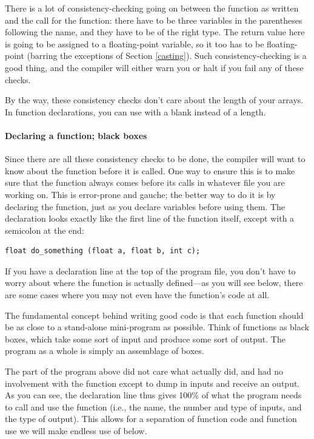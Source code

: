 \documentclass[12pt]{article}
\begin{document}
There is a lot of consistency-checking going on between the function as written
and the call for the function: there have to be three variables in the parentheses following the name,
and they have to be of the right type. The return value here is going to be assigned to a floating-point
variable, so it too has to be floating-point (barring the exceptions of Section \ref{casting}). Such
consistency-checking is a good thing, and the compiler will either warn you or halt if you fail any
of these checks.

By the way, these consistency checks don't care about the length of
your arrays. In function declarations, you can use 
with a blank instead of a length.  

\paragraph{Declaring a function; black boxes} 
Since there are all these consistency
checks to be done, the compiler will want to know about the function
before it is called. One way to ensure this is to make sure that
the function always comes before its calls in whatever file you are
working on. This is error-prone and gauche; the better way to do it is
by declaring the function, just as you declare variables before using
them. The declaration looks exactly like the first line of the function
itself, except with a semicolon at the end:

\begin{lstlisting}
float do_something (float a, float b, int c);
\end{lstlisting}

If you have a declaration line at the top of the program file, you don't
have to worry about where the function is actually defined---as
you will see below, there are some cases where you may not even have the
function's code at all. 

The fundamental concept behind writing good code is
that each function should be as close to a stand-alone mini-program as
possible. Think of functions as black boxes, which take some sort of
input and produce some sort of output. The program as a whole is
simply an assemblage of boxes.

The  part of the program above did not care what
 actually did, and had no involvement with the
function except to dump in inputs and receive an output. As you can see,
the declaration line thus gives 100\% of what the program needs to call
and use the function (i.e., the name, the number and type of inputs,
and the type of output). This allows for a separation of function code
and function use we will make endless use of below.
\end{document}
